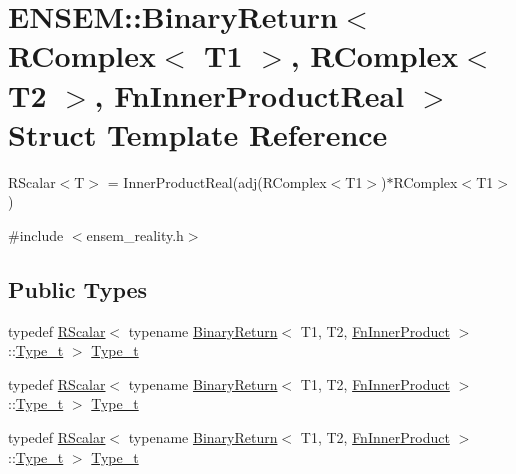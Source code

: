\hypertarget{structENSEM_1_1BinaryReturn_3_01RComplex_3_01T1_01_4_00_01RComplex_3_01T2_01_4_00_01FnInnerProductReal_01_4}{}\section{E\+N\+S\+EM\+:\+:Binary\+Return$<$ R\+Complex$<$ T1 $>$, R\+Complex$<$ T2 $>$, Fn\+Inner\+Product\+Real $>$ Struct Template Reference}
\label{structENSEM_1_1BinaryReturn_3_01RComplex_3_01T1_01_4_00_01RComplex_3_01T2_01_4_00_01FnInnerProductReal_01_4}


R\+Scalar$<$\+T$>$ = Inner\+Product\+Real(adj(\+R\+Complex$<$\+T1$>$)$\ast$\+R\+Complex$<$\+T1$>$)  




{\ttfamily \#include $<$ensem\+\_\+reality.\+h$>$}

\subsection*{Public Types}
\begin{DoxyCompactItemize}
\item 
typedef \mbox{\hyperlink{classENSEM_1_1RScalar}{R\+Scalar}}$<$ typename \mbox{\hyperlink{structENSEM_1_1BinaryReturn}{Binary\+Return}}$<$ T1, T2, \mbox{\hyperlink{structENSEM_1_1FnInnerProduct}{Fn\+Inner\+Product}} $>$\+::\mbox{\hyperlink{structENSEM_1_1BinaryReturn_3_01RComplex_3_01T1_01_4_00_01RComplex_3_01T2_01_4_00_01FnInnerProductReal_01_4_a37cd0480a2d3d2805d49d50858e6bbad}{Type\+\_\+t}} $>$ \mbox{\hyperlink{structENSEM_1_1BinaryReturn_3_01RComplex_3_01T1_01_4_00_01RComplex_3_01T2_01_4_00_01FnInnerProductReal_01_4_a37cd0480a2d3d2805d49d50858e6bbad}{Type\+\_\+t}}
\item 
typedef \mbox{\hyperlink{classENSEM_1_1RScalar}{R\+Scalar}}$<$ typename \mbox{\hyperlink{structENSEM_1_1BinaryReturn}{Binary\+Return}}$<$ T1, T2, \mbox{\hyperlink{structENSEM_1_1FnInnerProduct}{Fn\+Inner\+Product}} $>$\+::\mbox{\hyperlink{structENSEM_1_1BinaryReturn_3_01RComplex_3_01T1_01_4_00_01RComplex_3_01T2_01_4_00_01FnInnerProductReal_01_4_a37cd0480a2d3d2805d49d50858e6bbad}{Type\+\_\+t}} $>$ \mbox{\hyperlink{structENSEM_1_1BinaryReturn_3_01RComplex_3_01T1_01_4_00_01RComplex_3_01T2_01_4_00_01FnInnerProductReal_01_4_a37cd0480a2d3d2805d49d50858e6bbad}{Type\+\_\+t}}
\item 
typedef \mbox{\hyperlink{classENSEM_1_1RScalar}{R\+Scalar}}$<$ typename \mbox{\hyperlink{structENSEM_1_1BinaryReturn}{Binary\+Return}}$<$ T1, T2, \mbox{\hyperlink{structENSEM_1_1FnInnerProduct}{Fn\+Inner\+Product}} $>$\+::\mbox{\hyperlink{structENSEM_1_1BinaryReturn_3_01RComplex_3_01T1_01_4_00_01RComplex_3_01T2_01_4_00_01FnInnerProductReal_01_4_a37cd0480a2d3d2805d49d50858e6bbad}{Type\+\_\+t}} $>$ \mbox{\hyperlink{structENSEM_1_1BinaryReturn_3_01RComplex_3_01T1_01_4_00_01RComplex_3_01T2_01_4_00_01FnInnerProductReal_01_4_a37cd0480a2d3d2805d49d50858e6bbad}{Type\+\_\+t}}
\end{DoxyCompactItemize}


